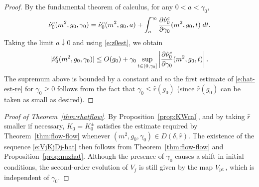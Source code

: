 \begin{proof}
By the fundamental theorem of calculus, for any $0 < a < \gamma_0$,
\begin{equation}
\hat\nu_0^c(m^2, g_0, \gamma_0)
  =
\hat\nu_0^c(m^2, g_0, a)
  +
\int_a^{\gamma_0} \frac{\partial \hat\nu_0^c}{\partial \gamma_0} (m^2, g_0, t) \; dt.
\end{equation}
Taking the limit $a\downarrow 0$ and using \eqref{e:z0est}, we obtain
\begin{equation}
|\hat\nu_0^c(m^2, g_0, \gamma_0)|
  \leq
O(g_0)
  +
\gamma_0
\sup_{t \in (0, \gamma_0]}
\left|\frac{\partial \hat\nu_0^c}{\partial \gamma_0}(m^2, g_0, t)\right|.
\end{equation}
The supremum above is bounded by a constant and so
the first estimate of \eqref{e:hat-est-re} for $\gamma_0 \geq 0$
follows from the fact that $\gamma_0 \leq \hat r(g_0)$
(since $\hat r(g_0)$ can be taken as small as desired).
\end{proof}

\begin{proof}[Proof of Theorem~\ref{thm:rhatflow}]
By Proposition~\ref{prop:KWcal},
and by taking $\hat r$ smaller if necessary,
$K_0 = K^\pm_0$ satisfies the estimate required by Theorem~\ref{thm:flow-flow}
whenever $(m^2, g_0, \gamma_0) \in D(\delta, \hat r)$. The
existence of the sequence \eqref{e:VjKjDj-hat} then follows from
Theorem~\ref{thm:flow-flow} and Proposition~\ref{prop:nuzhat}.
Although the presence of $\gamma_0$ causes a shift in initial
conditions, the second-order evolution of $V_j$ is still given by the map
$V_{\rm pt}$,
which is independent of $\gamma_0$.
\end{proof}
